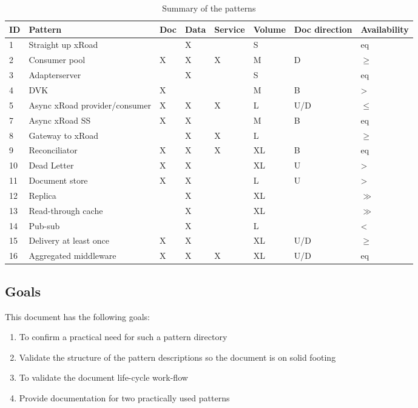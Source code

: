 \documentclass[10pt,a4paper]{article}
\begin{document}
\begin{table}
	\begin{center}
		\begin{tabular}{p{.6cm}p{3.4cm}p{.8cm}p{.8cm}p{.8cm}p{.8cm}p{1.2cm}p{1.2cm}}
		\toprule
ID & Pattern & Doc & Data & Service & Volume & Doc direction & Availability \\
\midrule
1 & Straight up xRoad &  & X &  & S &   & eq \\
2 & Consumer pool & X & X & X & M & D & $\geq$ \\
3 & Adapterserver &  & X &  & S &   & eq \\
4 & DVK & X &  &  & M & B & > \\
5 & Async xRoad provider/consumer & X & X & X & L & U/D & $\leq$ \\
7 & Async xRoad SS & X & X &  & M & B & eq \\
8 & Gateway to xRoad &  & X & X & L &   & $\geq$ \\
9 & Reconciliator & X & X & X & XL & B & eq \\
10 & Dead Letter & X & X &  & XL & U & > \\
11 & Document store & X & X &  & L & U & > \\
12 & Replica &  & X &  & XL &   & $\gg$ \\
13 & Read-through cache &  & X &  & XL &   & $\gg$ \\
14 & Pub-sub &  & X &  & L &  & < \\
15 & Delivery at least once & X & X & & XL & U/D & $\geq$ \\
16 & Aggregated middleware & X & X & X & XL & U/D & eq \\
\bottomrule
		\end{tabular}
		\caption{Summary of the patterns}
		\label{tab:dir}
	\end{center}
\end{table}

\subsection{Goals}
\label{sec:goals}
This document has the following goals:
\begin{enumerate}
	\item To confirm a practical need for such a pattern directory
	\item Validate the structure of the pattern descriptions so the document is on solid footing
    \item To validate the document life-cycle work-flow
    \item Provide documentation for two practically used patterns
\end{enumerate}
\end{document}
